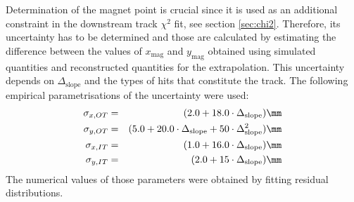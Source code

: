 Determination of the magnet point is crucial since it is used as an additional constraint in the downstream track $\chi^{2}$ fit, see section \ref{sec:chi2}. Therefore, its uncertainty has to be determined and those are calculated by estimating the difference between the values of $x_{\text{mag}}$ and
$y_{\text{mag}}$ obtained using simulated quantities and reconstructed quantities for the extrapolation. This uncertainty depends on $\Delta_{\text{slope}}$ and the types of hits that constitute the track. 
The following empirical parametrisations of the uncertainty
were used:
\begin{eqnarray}
\sigma_{x, OT} & = & (2.0 + 18.0\cdot \Delta_{\text{slope}})\mm \nonumber \\
\sigma_{y, OT} & = & (5.0 + 20.0\cdot \Delta_{\text{slope}} + 50\cdot \Delta_{\text{slope}}^{2})\mm  \nonumber \\
\sigma_{x, IT} & = & (1.0 + 16.0\cdot \Delta_{\text{slope}})\mm  \nonumber \\
\sigma_{y, IT} & = & (2.0 + 15\cdot \Delta_{\text{slope}})\mm  \nonumber
\end{eqnarray}
The numerical values of those parameters were obtained by fitting residual distributions.

